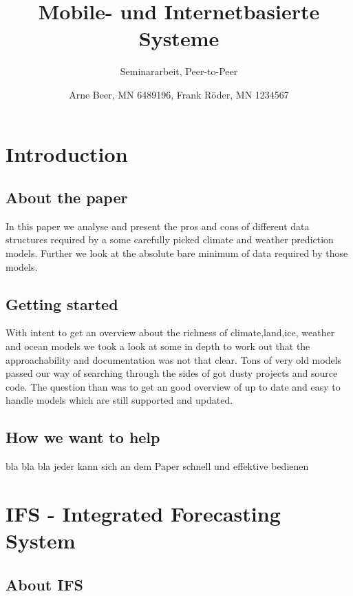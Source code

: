 \documentclass[]{article}
\title{Mobile- und Internetbasierte Systeme}
\author{Seminararbeit, Peer-to-Peer}
\date{Arne Beer, MN 6489196, Frank Röder, MN 1234567}
\begin{document}
\maketitle

{
\setcounter{tocdepth}{3}
\tableofcontents
}
\pagebreak

\section{Introduction}\label{introduction}

\subsection{About the paper}\label{about-the-paper}

In this paper we analyse and present the pros and cons of different data
structures required by a some carefully picked climate and weather
prediction models. Further we look at the absolute bare minimum of data
required by those models.

\subsection{Getting started}\label{getting-started}

With intent to get an overview about the richness of climate,land,ice,
weather and ocean models we took a look at some in depth to work out
that the approachability and documentation was not that clear. Tons of
very old models passed our way of searching through the sides of got
dusty projects and source code. The question than was to get an good
overview of up to date and easy to handle models which are still
supported and updated.

\subsection{How we want to help}\label{how-we-want-to-help}

bla bla bla jeder kann sich an dem Paper schnell und effektive bedienen

\section{IFS - Integrated Forecasting
System}\label{ifs---integrated-forecasting-system}

\subsection{About IFS}\label{about-ifs}
\end{document}
